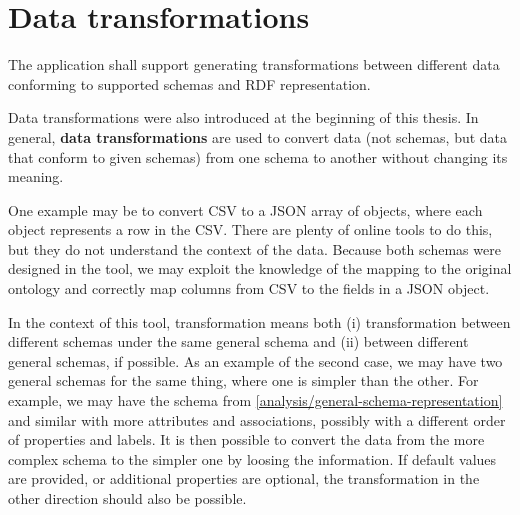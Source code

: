 \section{Data transformations}

\begin{requirement}
    The application shall support generating transformations between different data conforming to supported schemas and RDF representation.
    \label{req:transformations}
\end{requirement}

Data transformations were also introduced at the beginning of this thesis. In general, \textbf{data transformations} are used to convert data (not schemas, but data that conform to given schemas) from one schema to another without changing its meaning.

One example may be to convert CSV to a JSON array of objects, where each object represents a row in the CSV. There are plenty of online tools to do this, but they do not understand the context of the data. Because both schemas were designed in the tool, we may exploit the knowledge of the mapping to the original ontology and correctly map columns from CSV to the fields in a JSON object.

In the context of this tool, transformation means both (i) transformation between different schemas under the same general schema and (ii) between different general schemas, if possible. As an example of the second case, we may have two general schemas for the same thing, where one is simpler than the other. For example, we may have the schema from \autoref{analysis/general-schema-representation} and similar with more attributes and associations, possibly with a different order of properties and labels. It is then possible to convert the data from the more complex schema to the simpler one by loosing the information. If default values are provided, or additional properties are optional, the transformation in the other direction should also be possible.

\medskip

